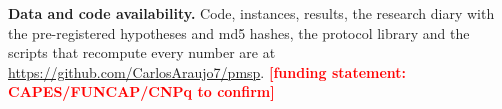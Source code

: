 \documentclass[conference,a4paper]{IEEEtran}
\newif\ifdraftmarks \draftmarkstrue
\newif\ifanon \anonfalse %
\newcommand{\todonote}[1]{\ifdraftmarks\textcolor{red}{\textbf{[#1]}}\fi}
\begin{document}
\vspace{2mm}
\noindent\textbf{Data and code availability.} Code, instances, results, the research diary with the pre-registered hypotheses and md5 hashes, the protocol library and the scripts that recompute every number are at
\ifanon an anonymized repository, whose link is given in the submission system.\else\url{https://github.com/CarlosAraujo7/pmsp}. \todonote{funding statement: CAPES/FUNCAP/CNPq to confirm}\fi



\end{document}
